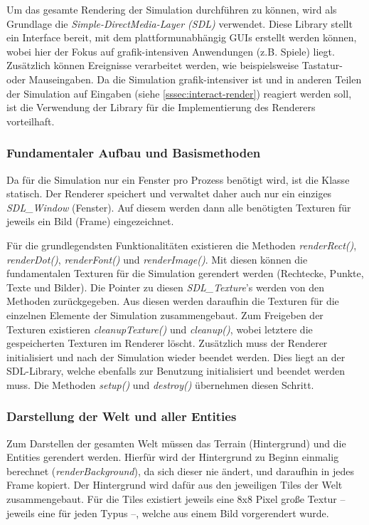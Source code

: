 \documentclass[course=erap]{aspdoc}
\begin{document}
Um das gesamte Rendering der Simulation durchführen zu können, wird als Grundlage die \emph{Simple-DirectMedia-Layer (SDL)} verwendet. Diese Library stellt ein Interface bereit, mit dem plattformunabhängig GUIs erstellt werden können, wobei hier der Fokus auf grafik-intensiven Anwendungen (z.B. Spiele) liegt. Zusätzlich können Ereignisse verarbeitet werden, wie beispielsweise Tastatur- oder Mauseingaben. Da die Simulation grafik-intensiver ist und in anderen Teilen der Simulation auf Eingaben (siehe \ref{sssec:interact-render}) reagiert werden soll, ist die Verwendung der Library für die Implementierung des Renderers vorteilhaft.


\subsubsection{Fundamentaler Aufbau und Basismethoden}
Da für die Simulation nur ein Fenster pro Prozess benötigt wird, ist die Klasse statisch. Der Renderer speichert und verwaltet daher auch nur ein einziges \emph{SDL\_Window} (Fenster). Auf diesem werden dann alle benötigten Texturen für jeweils ein Bild (Frame) eingezeichnet.

Für die grundlegendsten Funktionalitäten existieren die Methoden \emph{renderRect()}, \emph{renderDot()}, \emph{renderFont()} und \emph{renderImage()}. Mit diesen können die fundamentalen Texturen für die Simulation gerendert werden (Rechtecke, Punkte, Texte und Bilder). Die Pointer zu diesen \emph{SDL\_Texture}'s werden von den Methoden zurückgegeben. Aus diesen werden daraufhin die Texturen für die einzelnen Elemente der Simulation zusammengebaut.  Zum Freigeben der Texturen existieren \emph{cleanupTexture()} und \emph{cleanup()}, wobei letztere die gespeicherten Texturen im Renderer löscht. Zusätzlich muss der Renderer initialisiert und nach der Simulation wieder beendet werden. Dies liegt an der SDL-Library, welche ebenfalls zur Benutzung initialisiert und beendet werden muss. Die Methoden \emph{setup()} und \emph{destroy()} übernehmen diesen Schritt.


\subsubsection{Darstellung der Welt und aller Entities}
Zum Darstellen der gesamten Welt müssen das Terrain (Hintergrund) und die Entities gerendert werden. Hierfür wird der Hintergrund zu Beginn einmalig berechnet (\emph{renderBackground}), da sich dieser nie ändert, und daraufhin in jedes Frame kopiert.
Der Hintergrund wird dafür aus den jeweiligen Tiles der Welt zusammengebaut. Für die Tiles existiert jeweils eine 8x8 Pixel große Textur -- jeweils eine für jeden Typus --, welche aus einem Bild vorgerendert wurde.
\end{document}
